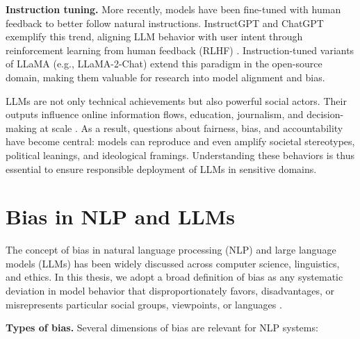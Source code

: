 \textbf{Instruction tuning.} More recently, models have been fine-tuned with human feedback to better follow natural instructions. InstructGPT and ChatGPT exemplify this trend, aligning LLM behavior with user intent through reinforcement learning from human feedback (RLHF) \parencite{ouyang2022training}. Instruction-tuned variants of LLaMA (e.g., LLaMA-2-Chat) extend this paradigm in the open-source domain, making them valuable for research into model alignment and bias.  

LLMs are not only technical achievements but also powerful social actors. Their outputs influence online information flows, education, journalism, and decision-making at scale \parencite{STAHL2024102700}\parencite{navigating-llm-ethics}. As a result, questions about fairness, bias, and accountability have become central: models can reproduce and even amplify societal stereotypes, political leanings, and ideological framings. Understanding these behaviors is thus essential to ensure responsible deployment of LLMs in sensitive domains.




\section{Bias in NLP and LLMs}

The concept of bias in natural language processing (NLP) and large language models (LLMs) has been widely discussed across computer science, linguistics, and ethics. In this thesis, we adopt a broad definition of bias as any systematic deviation in model behavior that disproportionately favors, disadvantages, or misrepresents particular social groups, viewpoints, or languages \parencite{navigating-llm-ethics}\parencite{STAHL2024102700}.  

\textbf{Types of bias.}  
Several dimensions of bias are relevant for NLP systems:  

